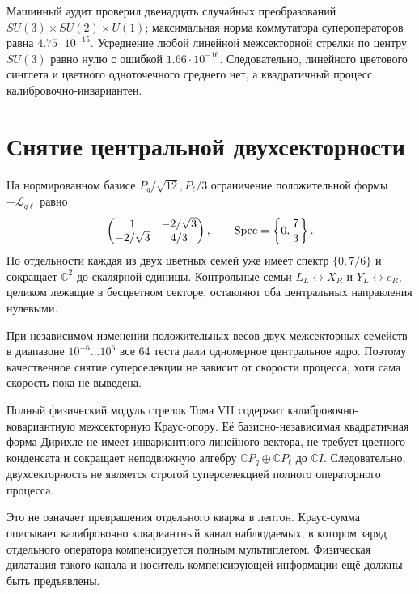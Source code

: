 Машинный аудит проверил двенадцать случайных преобразований
$SU(3)\times SU(2)\times U(1)$; максимальная норма коммутатора
супероператоров равна $4.75\cdot10^{-15}$. Усреднение любой линейной
межсекторной стрелки по центру $SU(3)$ равно нулю с ошибкой
$1.66\cdot10^{-16}$. Следовательно, линейного цветового синглета и цветного
одноточечного среднего нет, а квадратичный процесс калибровочно-инвариантен.

\section{Снятие центральной двухсекторности}

На нормированном базисе $P_q/\sqrt{12},P_\ell/3$ ограничение положительной
формы $-\mathcal L_{q\ell}$ равно
\begin{equation}
 \begin{pmatrix}
 1&-2/\sqrt3\\
 -2/\sqrt3&4/3
 \end{pmatrix},
 \qquad
 \operatorname{Spec}=\left\{0,\frac73\right\}.
 \label{eq:v8-cross-kraus-central-restriction}
\end{equation}
По отдельности каждая из двух цветных семей уже имеет спектр
$\{0,7/6\}$ и сокращает $\mathbb C^2$ до скалярной единицы. Контрольные
семьи $L_L\leftrightarrow X_R$ и $Y_L\leftrightarrow e_R$, целиком лежащие
в бесцветном секторе, оставляют оба центральных направления нулевыми.

При независимом изменении положительных весов двух межсекторных семейств в
диапазоне $10^{-6}\ldots10^6$ все 64 теста дали одномерное центральное
ядро. Поэтому качественное снятие суперселекции не зависит от скорости
процесса, хотя сама скорость пока не выведена.

\begin{theorem}
Полный физический модуль стрелок Тома VII содержит калибровочно-ковариантную
межсекторную Краус-опору. Её базисно-независимая квадратичная форма Дирихле
не имеет инвариантного линейного вектора, не требует цветного конденсата и
сокращает неподвижную алгебру
$\mathbb CP_q\oplus\mathbb CP_\ell$ до $\mathbb CI$. Следовательно,
двухсекторность не является строгой суперселекцией полного операторного
процесса.
\end{theorem}

\begin{remark}
Это не означает превращения отдельного кварка в лептон. Краус-сумма
описывает калибровочно ковариантный канал наблюдаемых, в котором заряд отдельного
оператора компенсируется полным мультиплетом. Физическая дилатация такого
канала и носитель компенсирующей информации ещё должны быть предъявлены.
\end{remark}

